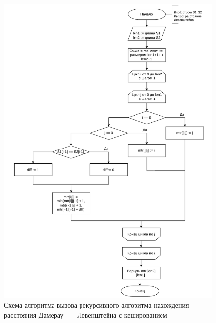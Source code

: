 \begin{figure}[h]
	\centering
	\includegraphics[height=0.9\textheight, page=4]{algo-scheme.pdf}
	\caption{Схема алгоритма вызова рекурсивного алгоритма нахождения расстояния Дамерау~---~Левенштейна с кешированием}
	\label{fig:dam-lev-rec-cache-decor}
\end{figure}

